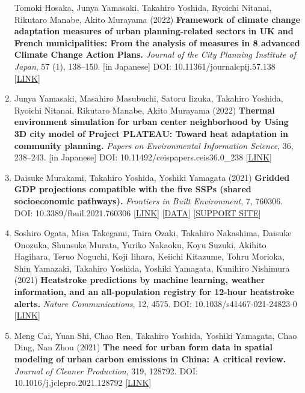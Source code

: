 \documentclass[
]{book}
\begin{document}
\begin{enumerate}
  Tomoki Hosaka, Junya Yamasaki, Takahiro Yoshida, Ryoichi Nitanai, Rikutaro Manabe, Akito Murayama (2022)
  \textbf{Framework of climate change adaptation measures of urban planning-related sectors in UK and French municipalities: From the analysis of measures in 8 advanced Climate Change Action Plans.}
  \emph{Journal of the City Planning Institute of Japan}, 57 (1), 138--150. {[}in Japanese{]}
  DOI: 10.11361/journalcpij.57.138 {[}\href{https://doi.org/10.11361/journalcpij.57.138}{LINK}{]}
\item
  Junya Yamasaki, Masahiro Masubuchi, Satoru Iizuka, Takahiro Yoshida, Ryoichi Nitanai, Rikutaro Manabe, Akito Murayama (2022)
  \textbf{Thermal environment simulation for urban center neighborhood by Using 3D city model of Project PLATEAU: Toward heat adaptation in community planning.}
  \emph{Papers on Environmental Information Science}, 36, 238--243. {[}in Japanese{]}
  DOI: 10.11492/ceispapers.ceis36.0\_238 {[}\href{https://doi.org/10.11492/ceispapers.ceis36.0_238}{LINK}{]}
\item
  Daisuke Murakami, Takahiro Yoshida, Yoshiki Yamagata (2021)
  \textbf{Gridded GDP projections compatible with the five SSPs (shared socioeconomic pathways).}
  \emph{Frontiers in Built Environment}, 7, 760306.
  DOI: 10.3389/fbuil.2021.760306 {[}\href{https://www.frontiersin.org/articles/10.3389/fbuil.2021.760306/abstract}{LINK}{]} {[}\href{https://figshare.com/articles/dataset/Gridded_GDP_projections_compatible_with_the_five_SSPs_Shared_Socioeconomic_Pathways_/12016506/1}{DATA}{]}
  {[}\href{https://gcp-tsukuba.github.io/SSP-downscale/}{SUPPORT SITE}{]}
\item
  Soshiro Ogata, Misa Takegami, Taira Ozaki, Takahiro Nakashima, Daisuke Onozuka, Shunsuke Murata, Yuriko Nakaoku, Koyu Suzuki, Akihito Hagihara, Teruo Noguchi, Koji Iihara, Keiichi Kitazume, Tohru Morioka, Shin Yamazaki, Takahiro Yoshida, Yoshiki Yamagata, Kunihiro Nishimura (2021)
  \textbf{Heatstroke predictions by machine learning, weather information, and an all-population registry for 12-hour heatstroke alerts.}
  \emph{Nature Communications}, 12, 4575.
  DOI: 10.1038/s41467-021-24823-0 {[}\href{https://www.nature.com/articles/s41467-021-24823-0}{LINK}{]}
\item
  Meng Cai, Yuan Shi, Chao Ren, Takahiro Yoshida, Yoshiki Yamagata, Chao Ding, Nan Zhou (2021)
  \textbf{The need for urban form data in spatial modeling of urban carbon emissions in China: A critical review.}
  \emph{Journal of Cleaner Production}, 319, 128792.
  DOI: 10.1016/j.jclepro.2021.128792 {[}\href{https://doi.org/10.1016/j.jclepro.2021.128792}{LINK}{]}

\end{enumerate}
\end{document}
